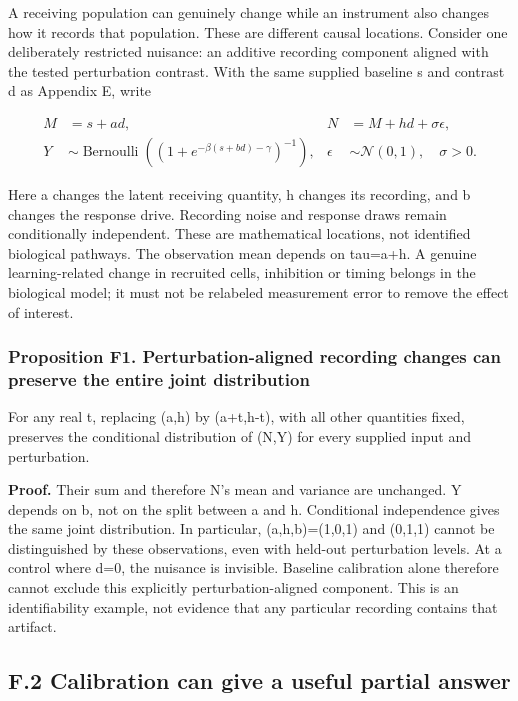 \documentclass[
  american,
  11pt,
  letterpaper,
]{article}
\begin{document}
A receiving population can genuinely change while an instrument also changes how it records that population. These are different causal locations. Consider one deliberately restricted nuisance: an additive recording component aligned with the tested perturbation contrast. With the same supplied baseline s and contrast d as Appendix E, write

\[
\begin{aligned}
M&=s+a d, &N&=M+h d+\sigma\epsilon,\\
Y&\sim\operatorname{Bernoulli}\!\left((1+e^{-\beta(s+b d)-\gamma})^{-1}\right),
&\epsilon&\sim\mathcal N(0,1),\quad\sigma>0.
\end{aligned}\tag{F1}
\]

Here a changes the latent receiving quantity, h changes its recording, and b changes the response drive. Recording noise and response draws remain conditionally independent. These are mathematical locations, not identified biological pathways. The observation mean depends on tau=a+h. A genuine learning-related change in recruited cells, inhibition or timing belongs in the biological model; it must not be relabeled measurement error to remove the effect of interest.

\subsubsection{Proposition F1. Perturbation-aligned recording changes can preserve the entire joint distribution}\label{proposition-f1.-perturbation-aligned-recording-changes-can-preserve-the-entire-joint-distribution}

For any real t, replacing (a,h) by (a+t,h-t), with all other quantities fixed, preserves the conditional distribution of (N,Y) for every supplied input and perturbation.

\textbf{Proof.} Their sum and therefore N's mean and variance are unchanged. Y depends on b, not on the split between a and h. Conditional independence gives the same joint distribution. In particular, (a,h,b)=(1,0,1) and (0,1,1) cannot be distinguished by these observations, even with held-out perturbation levels. At a control where d=0, the nuisance is invisible. Baseline calibration alone therefore cannot exclude this explicitly perturbation-aligned component. This is an identifiability example, not evidence that any particular recording contains that artifact.

\subsection{F.2 Calibration can give a useful partial answer}\label{f.2-calibration-can-give-a-useful-partial-answer}
\end{document}
